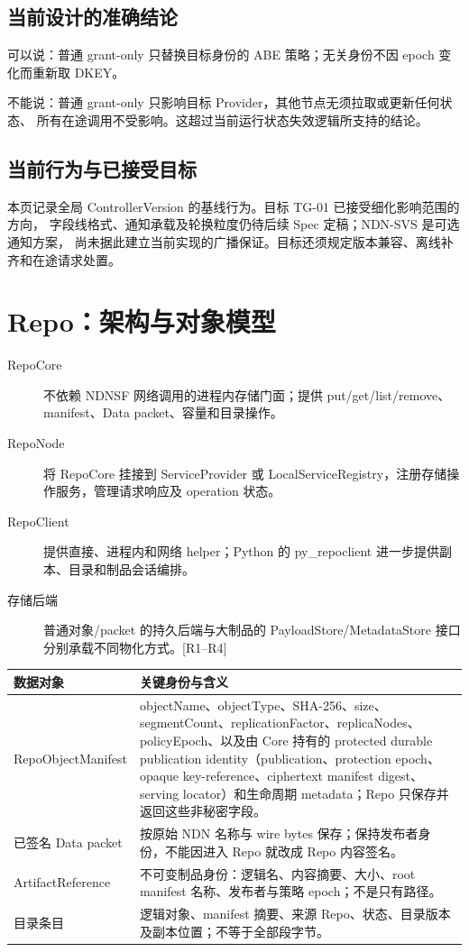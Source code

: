 \subsection{当前设计的准确结论}
可以说：普通 grant-only 只替换目标身份的 ABE 策略；无关身份不因 epoch
变化而重新取 DKEY。

不能说：普通 grant-only 只影响目标 Provider，其他节点无须拉取或更新任何状态、
所有在途调用不受影响。这超过当前运行状态失效逻辑所支持的结论。

\subsection{当前行为与已接受目标}
本页记录全局 ControllerVersion 的基线行为。目标 TG-01 已接受细化影响范围的方向，
字段线格式、通知承载及轮换粒度仍待后续 Spec 定稿；NDN-SVS 是可选通知方案，
尚未据此建立当前实现的广播保证。目标还须规定版本兼容、离线补齐和在途请求处置。

\newpage

\section{Repo：架构与对象模型}
\begin{description}
\item[RepoCore] 不依赖 NDNSF 网络调用的进程内存储门面；提供 put/get/list/remove、manifest、Data packet、容量和目录操作。
\item[RepoNode] 将 RepoCore 挂接到 ServiceProvider 或 LocalServiceRegistry，注册存储操作服务，管理请求响应及 operation 状态。
\item[RepoClient] 提供直接、进程内和网络 helper；Python 的 py\_repoclient 进一步提供副本、目录和制品会话编排。
\item[存储后端] 普通对象/packet 的持久后端与大制品的 PayloadStore/MetadataStore 接口分别承载不同物化方式。[R1--R4]
\end{description}

\begin{tabularx}{\linewidth}{@{}p{35mm}X@{}}
\toprule
数据对象 & 关键身份与含义 \\
\midrule
RepoObjectManifest & objectName、objectType、SHA-256、size、segmentCount、replicationFactor、replicaNodes、policyEpoch、以及由 Core 持有的 protected durable publication identity（publication、protection epoch、opaque key-reference、ciphertext manifest digest、serving locator）和生命周期 metadata；Repo 只保存并返回这些非秘密字段。\\
已签名 Data packet & 按原始 NDN 名称与 wire bytes 保存；保持发布者身份，不能因进入 Repo 就改成 Repo 内容签名。\\
ArtifactReference & 不可变制品身份：逻辑名、内容摘要、大小、root manifest 名称、发布者与策略 epoch；不是只有路径。\\
目录条目 & 逻辑对象、manifest 摘要、来源 Repo、状态、目录版本及副本位置；不等于全部段字节。\\
\bottomrule
\end{tabularx}

